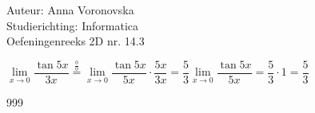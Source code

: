 \documentclass[a4paper]{article}
\begin{document}
  
\noindent \large Auteur: Anna Voronovska \\
\noindent \large Studierichting: Informatica\\
\noindent \large Oefeningenreeks 2D nr. 14.3\\

\medskip

\normalsize

$\lim\limits_{x \to 0} \dfrac{\tan 5x}{3x} \stackrel{\frac{0}{0}}{=} \lim\limits_{x \to 0} \dfrac{\tan 5x}{5x} \cdot \dfrac{5x}{3x} = \dfrac{5}{3} \lim\limits_{x \to 0} \dfrac{\tan 5x}{5x} = \dfrac{5}{3} \cdot 1 = \dfrac{5}{3}$


\begin{thebibliography}{999}
\end{thebibliography}
\end{document}
